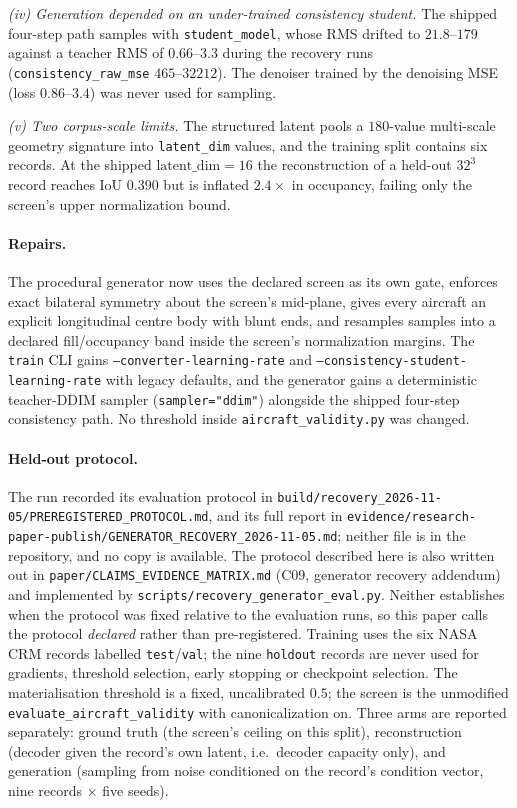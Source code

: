 \emph{(iv) Generation depended on an under-trained consistency student.} The shipped
four-step path samples with \texttt{student\_model}, whose RMS drifted to $21.8$--$179$
against a teacher RMS of $0.66$--$3.3$ during the recovery runs
(\texttt{consistency\_raw\_mse} $465$--$32212$). The denoiser trained by the denoising
MSE (loss $0.86$--$3.4$) was never used for sampling.

\emph{(v) Two corpus-scale limits.} The structured latent pools a $180$-value multi-scale
geometry signature into \texttt{latent\_dim} values, and the training split contains six
records. At the shipped $\text{latent\_dim}=16$ the reconstruction of a held-out $32^3$
record reaches IoU $0.390$ but is inflated $2.4\times$ in occupancy, failing only the
screen's upper normalization bound.

\paragraph{Repairs.}
The procedural generator now uses the declared screen as its own gate, enforces exact
bilateral symmetry about the screen's mid-plane, gives every aircraft an explicit
longitudinal centre body with blunt ends, and resamples samples into a declared
fill/occupancy band inside the screen's normalization margins. The \texttt{train} CLI
gains \texttt{--converter-learning-rate} and
\texttt{--consistency-student-learning-rate} with legacy defaults, and the generator
gains a deterministic teacher-DDIM sampler (\texttt{sampler="ddim"}) alongside the
shipped four-step consistency path. No threshold inside \texttt{aircraft\_validity.py}
was changed.

\paragraph{Held-out protocol.}
The run recorded its evaluation protocol in
\texttt{build/recovery\_2026-11-05/PREREGISTERED\_PROTOCOL.md}, and its full report in
\texttt{evidence/research-paper-publish/GENERATOR\_RECOVERY\_2026-11-05.md}; neither file
is in the repository, and no copy is available. The protocol described here is also
written out in
\texttt{paper/CLAIMS\_EVIDENCE\_MATRIX.md} (C09, generator recovery addendum) and
implemented by \texttt{scripts/recovery\_generator\_eval.py}. Neither establishes when the
protocol was fixed relative to the evaluation runs, so this paper calls the protocol
\emph{declared} rather than pre-registered. Training uses the six
NASA CRM records labelled \texttt{test}/\texttt{val}; the nine \texttt{holdout} records
are never used for gradients, threshold selection, early stopping or checkpoint
selection. The materialisation threshold is a fixed, uncalibrated $0.5$; the screen is
the unmodified \texttt{evaluate\_aircraft\_validity} with canonicalization on. Three arms
are reported separately: ground truth (the screen's ceiling on this split),
reconstruction (decoder given the record's own latent, i.e.\ decoder capacity only), and
generation (sampling from noise conditioned on the record's condition vector, nine
records $\times$ five seeds).

